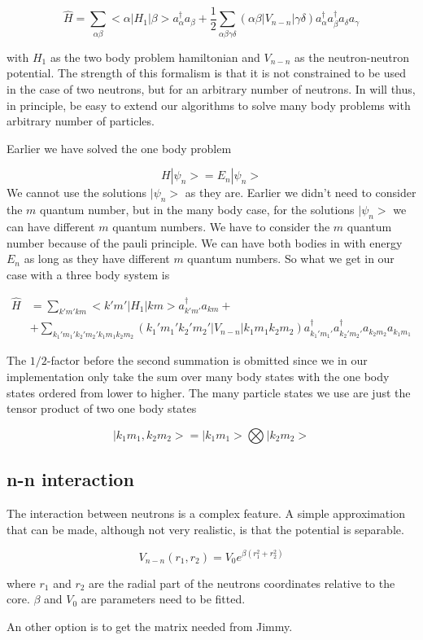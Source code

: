 \begin{equation}
\hat{H} =
\sum_{\alpha \beta} <\alpha| H_1 |\beta> a_{\alpha}^{\dagger} a_{\beta} + \frac{1}{2}\sum_{\alpha \beta \gamma \delta} ( \alpha \beta| V_{n-n} | \gamma \delta ) a_{\alpha}^{\dagger} a_{\beta}^{\dagger} a_{\delta} a_{\gamma}
\end{equation}

with $H_1$ as the two body problem hamiltonian and $V_{n-n}$ as the neutron-neutron potential. The strength of this formalism is that it is not constrained to be used in the case of two neutrons, but for an arbitrary number of neutrons. In will thus, in principle, be easy to extend our algorithms to solve many body problems with arbitrary number of particles. 

Earlier we have solved the one body problem

\begin{equation}
H | \psi_n > = E_n | \psi_n >
\end{equation}
We cannot use the solutions $| \psi_n>$ as they are. Earlier we didn't need to consider the $m$ quantum number, but in the many body case, for the solutions $| \psi_n>$ we can have different $m$ quantum numbers. We have to consider the $m$ quantum number because of the pauli principle. We can have both bodies in with energy $E_n$ as long as they have different $m$ quantum numbers. So what we get in our case with a three body system is

\begin{align}
\hat{H} &= \sum_{k' m' k m } <k'm'| H_1 |km> a_{k'm'}^{\dagger} a_{km} + \\
& + \sum_{k_1' m_1' k_2' m_2' k_1 m_1 k_2 m_2} ( k_1' m_1' k_2' m_2'| V_{n-n} | k_1 m_1 k_2 m_2 ) a_{k_1' m_1'}^{\dagger} a_{k_2' m_2'}^{\dagger} a_{k_2 m_2} a_{k_1 m_1}\label{two-body op sum}
\end{align}

The $1/2$-factor before the second summation is obmitted since we in our implementation only take the sum over many body states with the one body states ordered from lower to higher. The many particle states we use are just the tensor product of two one body states

\begin{equation}
|k_1 m_1 , k_2 m_2 > = |k_1 m_1> \bigotimes |k_2 m_2 >
\end{equation}

\subsection{n-n interaction}
The interaction between neutrons is a complex feature. A simple approximation that can be made, although not very realistic, is that the potential is separable. 

\begin{equation}
V_{n-n}(r_{1} , r_{2}) = V_{0}e^{ \beta (r_1^2 + r_2^2)}
\end{equation}

where $r_1$ and $r_2$ are the radial part of the neutrons coordinates relative to the core. $\beta$ and $V_{0}$ are parameters need to be fitted. 

An other option is to get the matrix needed from Jimmy.
